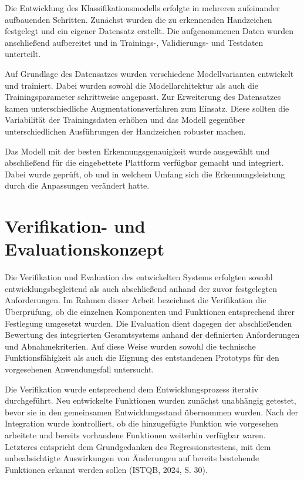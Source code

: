 Die Entwicklung des Klassifikationsmodells erfolgte in mehreren aufeinander aufbauenden Schritten. Zunächst wurden die zu erkennenden Handzeichen festgelegt und ein eigener Datensatz erstellt. Die aufgenommenen Daten wurden anschließend aufbereitet und in Trainings-, Validierungs- und Testdaten unterteilt.

Auf Grundlage des Datensatzes wurden verschiedene Modellvarianten entwickelt und trainiert. Dabei wurden sowohl die Modellarchitektur als auch die Trainingsparameter schrittweise angepasst. Zur Erweiterung des Datensatzes kamen unterschiedliche Augmentationsverfahren zum Einsatz. Diese sollten die Variabilität der Trainingsdaten erhöhen und das Modell gegenüber unterschiedlichen Ausführungen der Handzeichen robuster machen.

Das Modell mit der besten Erkennungsgenauigkeit wurde ausgewählt und abschließend für die eingebettete Plattform verfügbar gemacht und integriert. Dabei wurde geprüft, ob und in welchem Umfang sich die Erkennungsleistung durch die Anpassungen verändert hatte.

\section{Verifikation- und Evaluationskonzept}

Die Verifikation und Evaluation des entwickelten Systems erfolgten sowohl entwicklungsbegleitend als auch abschließend anhand der zuvor festgelegten Anforderungen. Im Rahmen dieser Arbeit bezeichnet die Verifikation die Überprüfung, ob die einzelnen Komponenten und Funktionen entsprechend ihrer Festlegung umgesetzt wurden. Die Evaluation dient dagegen der abschließenden Bewertung des integrierten Gesamtsystems anhand der definierten Anforderungen und Abnahmekriterien. Auf diese Weise wurden sowohl die technische Funktionsfähigkeit als auch die Eignung des entstandenen Prototyps für den vorgesehenen Anwendungsfall untersucht.

Die Verifikation wurde entsprechend dem Entwicklungsprozess iterativ durchgeführt. Neu entwickelte Funktionen wurden zunächst unabhängig getestet, bevor sie in den gemeinsamen Entwicklungsstand übernommen wurden. Nach der Integration wurde kontrolliert, ob die hinzugefügte Funktion wie vorgesehen arbeitete und bereits vorhandene Funktionen weiterhin verfügbar waren. Letzteres entspricht dem Grundgedanken des Regressionstestens, mit dem unbeabsichtigte Auswirkungen von Änderungen auf bereits bestehende Funktionen erkannt werden sollen (ISTQB, 2024, S. 30).


